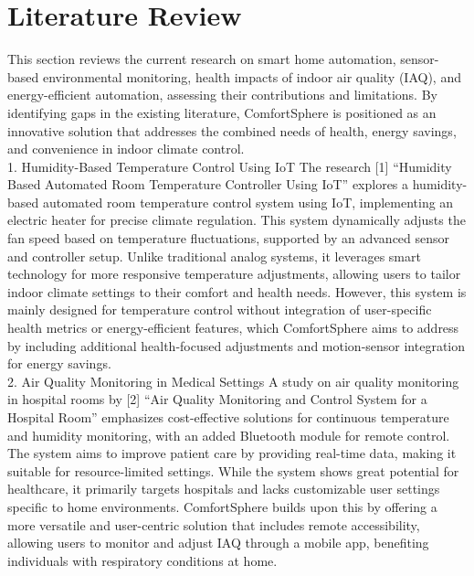 \documentclass{article}
\begin{document}
\section{Literature Review}
This section reviews the current research on smart home automation, sensor-based environmental monitoring, health impacts of indoor air quality (IAQ), and energy-efficient automation, assessing their contributions and limitations. By identifying gaps in the existing literature, ComfortSphere is positioned as an innovative solution that addresses the combined needs of health, energy savings, and convenience in indoor climate control.\\

1. Humidity-Based Temperature Control Using IoT
The research [1] “Humidity Based Automated Room Temperature Controller Using IoT” explores a humidity-based automated room temperature control system using IoT, implementing an electric heater for precise climate regulation. This system dynamically adjusts the fan speed based on temperature fluctuations, supported by an advanced sensor and controller setup. Unlike traditional analog systems, it leverages smart technology for more responsive temperature adjustments, allowing users to tailor indoor climate settings to their comfort and health needs. However, this system is mainly designed for temperature control without integration of user-specific health metrics or energy-efficient features, which ComfortSphere aims to address by including additional health-focused adjustments and motion-sensor integration for energy savings.\\

2. Air Quality Monitoring in Medical Settings
A study on air quality monitoring in hospital rooms by [2] “Air Quality Monitoring and Control System for a Hospital Room” emphasizes cost-effective solutions for continuous temperature and humidity monitoring, with an added Bluetooth module for remote control. The system aims to improve patient care by providing real-time data, making it suitable for resource-limited settings. While the system shows great potential for healthcare, it primarily targets hospitals and lacks customizable user settings specific to home environments. ComfortSphere builds upon this by offering a more versatile and user-centric solution that includes remote accessibility, allowing users to monitor and adjust IAQ through a mobile app, benefiting individuals with respiratory conditions at home.\\
\end{document}
